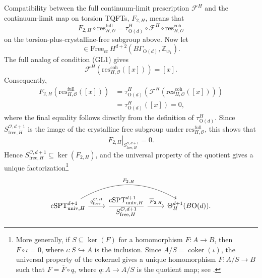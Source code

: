 \documentclass[aps,prx,reprint,superscriptaddress,twocolumn,amsmath,amssymb,amsfonts, nofootinbib]{revtex4-2}
\newcommand{\res}{\text{res}}
\newcommand{\Z}{\mathbb{Z}}
\theoremstyle{apsstyle}
\begin{document}
Compatibility between the full continuum-limit prescription
$\mathcal F^H$ and the continuum-limit map on torsion TQFTs,
$F_{2,H}$, means that
\begin{equation*}
F_{2,H}\circ\res_{H,\mathcal O}^{\mathrm{full}}
=\tau_{\mathrm{O}(d)}^{H} \circ\mathcal F^H \circ\res_{H,\mathcal O}^{\mathrm{coh}}
\end{equation*}
on the torsion-plus-crystalline-free subgroup above.
Now let
\begin{equation*}
[x]\in
\mathrm{Free}_{\mathrm{cr}}\,
H^{d+2}(B\Gamma_{\mathrm{O}(d)},\Z_{w_1}).
\end{equation*}
The full analog of condition {\rm(GL1)} gives
\begin{equation*}
\mathcal F^H\left( \res_{H,\mathcal O}^{\mathrm{coh}}([x]) \right) =[x].
\end{equation*}
Consequently,
\begin{align*}
F_{2,H}\left( \res_{H,\mathcal O}^{\mathrm{full}}([x]) \right)
&= \tau_{\mathrm{O}(d)}^{H}\left(
\mathcal F^H\left( \res_{H,\mathcal O}^{\mathrm{coh}}([x]) \right) \right)\\
&= \tau_{\mathrm{O}(d)}^{H}([x])=0,
\end{align*}
where the final equality follows directly from the definition of
$\tau_{\mathrm{O}(d)}^{H}$. Since $S_{\mathrm{free},H}^{\mathcal O,d+1}$ is the image of the crystalline free subgroup under
$\res_{H,\mathcal O}^{\mathrm{full}}$, this shows that
\begin{equation*}
\left.F_{2,H}\right|_{S_{\mathrm{free},H}^{\mathcal O,d+1}} =0.
\end{equation*}
Hence $S_{\mathrm{free},H}^{\mathcal O,d+1} \subseteq \ker(F_{2,H})$, and the universal property of the quotient gives a unique factorization\footnote{More generally, if $S\subseteq\ker(F)$ for a homomorphism $F:A\to B$, then $F\circ\iota=0$, where $\iota:S\hookrightarrow A$ is the inclusion. Since $A/S=\operatorname{coker}(\iota)$, the universal property of the cokernel gives a unique homomorphism $\overline F:A/S\to B$ such that $F=\overline F\circ q$, where $q:A\to A/S$ is the quotient map; see
\cite[Tag 0106]{stacks-project}.}
\begin{equation}
\label{eq:quotient_O}
\begin{tikzcd}
\mathrm{cSPT}^{d+1}_{\mathrm{univ},H}
\arrow[r,"q_{\mathrm{free}}^{\mathcal O,H}"]
\arrow[rr,bend left=30,"F_{2,H}"]
& \dfrac{\mathrm{cSPT}^{d+1}_{\mathrm{univ},H}}
{S_{\mathrm{free},H}^{\mathcal O,d+1}}
\arrow[r,"\overline F_{2,H}"]
& \Theta^{d+1}_{H}(B\mathrm{O}(d)).
\end{tikzcd}
\end{equation}
\end{document}

